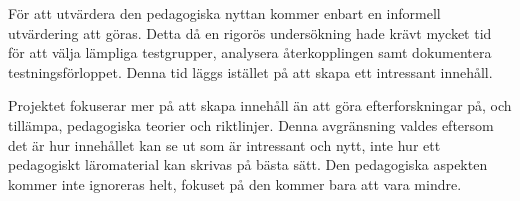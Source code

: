 För att utvärdera den pedagogiska nyttan kommer enbart en informell utvärdering
att göras. Detta då en rigorös undersökning hade krävt mycket tid för att välja
lämpliga testgrupper, analysera återkopplingen samt dokumentera
testningsförloppet. Denna tid läggs istället på att skapa ett intressant innehåll.

Projektet fokuserar mer på att skapa innehåll än att göra
efterforskningar på, och tillämpa, pedagogiska teorier och riktlinjer. Denna
avgränsning valdes eftersom det är hur innehållet kan se ut som är
intressant och nytt, inte hur ett pedagogiskt läromaterial kan skrivas på bästa sätt. Den
pedagogiska aspekten kommer inte ignoreras helt, fokuset på den kommer bara att
vara mindre.

